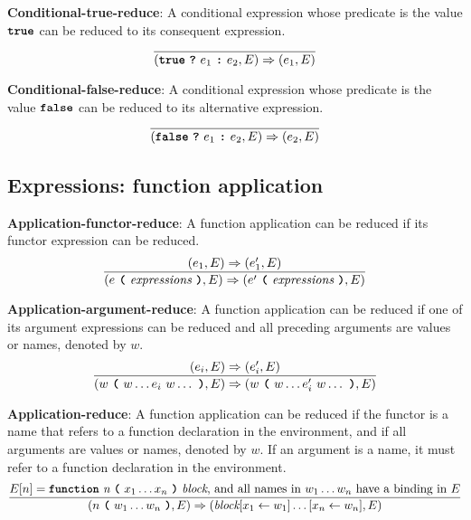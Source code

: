 \vspace{10mm}
\textbf{Conditional-true-reduce}: A conditional
expression whose predicate is the value
$\textbf{\texttt{true}}$
can be reduced to its consequent expression.
\[
\frac{
}{
  (\textbf{\texttt{true}}\  \textbf{\texttt{?}}\ e_1\ \textbf{\texttt{:}}\ e_2, E)
  \Rightarrow
  (e_1, E)
}
\]

\vspace{10mm}
\textbf{Conditional-false-reduce}: A conditional
expression whose predicate is the value
$\textbf{\texttt{false}}$
can be reduced to its alternative expression.
\[
\frac{
}{
  (\textbf{\texttt{false}}\  \textbf{\texttt{?}}\ e_1\ \textbf{\texttt{:}}\ e_2, E)
  \Rightarrow
  (e_2, E)
}
\]


\subsection*{Expressions: function application}

\textbf{Application-functor-reduce}: A function application
can be reduced if its functor expression can be reduced.
\[
\frac{
  ( e_1 , E ) \Rightarrow (e_1', E)
}{
  (e\  \textbf{\texttt{(}}\ \textit{expressions} \ \textbf{\texttt{)}}, E)
  \Rightarrow
  (e'\  \textbf{\texttt{(}}\ \textit{expressions} \ \textbf{\texttt{)}}, E)
}
\]

\vspace{10mm}
\textbf{Application-argument-reduce}: A function application
can be reduced if one of its argument expressions can be reduced and all
preceding arguments are values or names, denoted by $w$.
\[
\frac{
  ( e_i , E ) \Rightarrow (e_i', E)
}{
  (w\  \textbf{\texttt{(}}\ w \ldots e_i \ w \ldots\ \textbf{\texttt{)}}, E)
  \Rightarrow
  (w\  \textbf{\texttt{(}}\ w \ldots e_i' \ w \ldots\ \textbf{\texttt{)}}, E)
}
\]

\vspace{10mm}
\textbf{Application-reduce}: A function application
can be reduced if the functor is a name that refers to
a function declaration in the environment, and if all
arguments are values or names, denoted by $w$. If an argument
is a name, it must refer to a function declaration in the
environment.
\[
\frac{
  E[n] = \textbf{\texttt{function}}\  \textit{n} \ 
                 \textbf{\texttt{(}}\  x_1 \ldots x_n
                 \ \textbf{\texttt{)}}\ \textit{block}
\mbox{, and all names in $w_1 \ldots w_n$ have a binding in $E$}
}{
  (n\  \textbf{\texttt{(}}\ w_1 \ldots w_n\ \textbf{\texttt{)}}, E)
  \Rightarrow
  (\textit{block}[x_1 \leftarrow w_1]\ldots[x_n \leftarrow w_n], E)
}
\]




